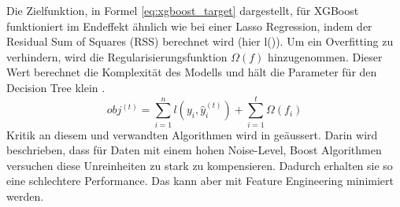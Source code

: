 %
Die Zielfunktion, in Formel \eqref{eq:xgboost_target} dargestellt, für XGBoost funktioniert im Endeffekt ähnlich wie bei einer Lasso Regression, indem der Residual Sum of Squares (RSS) berechnet wird (hier l()). 
Um ein Overfitting zu verhindern, wird die Regularisierungsfunktion $\Omega(f)$ hinzugenommen. Dieser Wert berechnet die Komplexität des Modells und hält die Parameter für den Decision Tree klein \cite{xgboost_1, xgboost_2}.
\begin{equation}
\label{eq:xgboost_target}
obj^{(t)} = \sum_{i=1}^{n} l(y_i, \hat{y}_{i}^{(t)}) + \sum_{i=1}^{t} \Omega(f_i)
\end{equation}
\newline
%
Kritik an diesem und verwandten Algorithmen wird in \cite{critic} geäussert. Darin wird beschrieben, dass für Daten mit einem hohen Noise-Level, Boost Algorithmen versuchen diese Unreinheiten zu stark zu kompensieren. Dadurch erhalten sie so eine schlechtere Performance. Das kann aber mit Feature Engineering minimiert werden.
%
